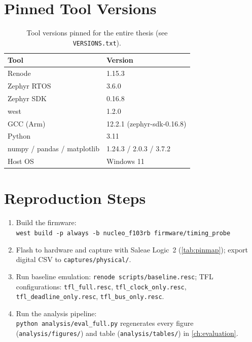 \section{Pinned Tool Versions}

\begin{table}[hb]
  \centering
  \caption[Pinned tool versions]{Tool versions pinned for the entire
    thesis (see \texttt{VERSIONS.txt}).}
  \label{tab:versions}
  \small
  \begin{tabular}{@{}ll@{}}
    \toprule
    Tool & Version \\
    \midrule
    Renode          & 1.15.3 \\
    Zephyr RTOS     & 3.6.0 \\
    Zephyr SDK      & 0.16.8 \\
    west            & 1.2.0 \\
    GCC (Arm)       & 12.2.1 (zephyr-sdk-0.16.8) \\
    Python          & 3.11 \\
    numpy / pandas / matplotlib & 1.24.3 / 2.0.3 / 3.7.2 \\
    Host OS         & Windows 11 \\
    \bottomrule
  \end{tabular}
\end{table}

\section{Reproduction Steps}

\begin{enumerate}
  \item Build the firmware:\\
        \texttt{west build -p always -b nucleo\_f103rb firmware/timing\_probe}
  \item Flash to hardware and capture with Saleae Logic~2
        (\cref{tab:pinmap}); export digital CSV to
        \texttt{captures/physical/}.
  \item Run baseline emulation: \texttt{renode scripts/baseline.resc};
        TFL configurations: \texttt{tfl\_full.resc},
        \texttt{tfl\_clock\_only.resc}, \texttt{tfl\_deadline\_only.resc},
        \texttt{tfl\_bus\_only.resc}.
  \item Run the analysis pipeline:\\
        \texttt{python analysis/eval\_full.py} regenerates every figure
        (\texttt{analysis/figures/}) and table
        (\texttt{analysis/tables/}) in \cref{ch:evaluation}.
\end{enumerate}
